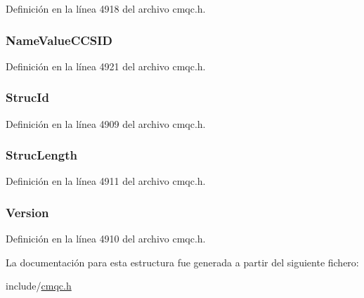 Definición en la línea 4918 del archivo cmqc.\+h.

\hypertarget{structtag_m_q_r_f_h2_a9efebd4dde2b30d7bda80cc35bb3864b}{}
\subsubsection[{Name\+Value\+C\+C\+S\+I\+D}]{ Name\+Value\+C\+C\+S\+I\+D}\label{structtag_m_q_r_f_h2_a9efebd4dde2b30d7bda80cc35bb3864b}


Definición en la línea 4921 del archivo cmqc.\+h.

\hypertarget{structtag_m_q_r_f_h2_a0530922ca944569b52601d74941f96e4}{}
\subsubsection[{Struc\+Id}]{ Struc\+Id}\label{structtag_m_q_r_f_h2_a0530922ca944569b52601d74941f96e4}


Definición en la línea 4909 del archivo cmqc.\+h.

\hypertarget{structtag_m_q_r_f_h2_a830af9a4a08c015b9a4b2d39d4d3420a}{}
\subsubsection[{Struc\+Length}]{ Struc\+Length}\label{structtag_m_q_r_f_h2_a830af9a4a08c015b9a4b2d39d4d3420a}


Definición en la línea 4911 del archivo cmqc.\+h.

\hypertarget{structtag_m_q_r_f_h2_a0656ef8f766b3907d394d88a35d7b7e9}{}
\subsubsection[{Version}]{ Version}\label{structtag_m_q_r_f_h2_a0656ef8f766b3907d394d88a35d7b7e9}


Definición en la línea 4910 del archivo cmqc.\+h.



La documentación para esta estructura fue generada a partir del siguiente fichero\+:\begin{DoxyCompactItemize}
\item 
include/\hyperlink{cmqc_8h}{cmqc.\+h}\end{DoxyCompactItemize}
